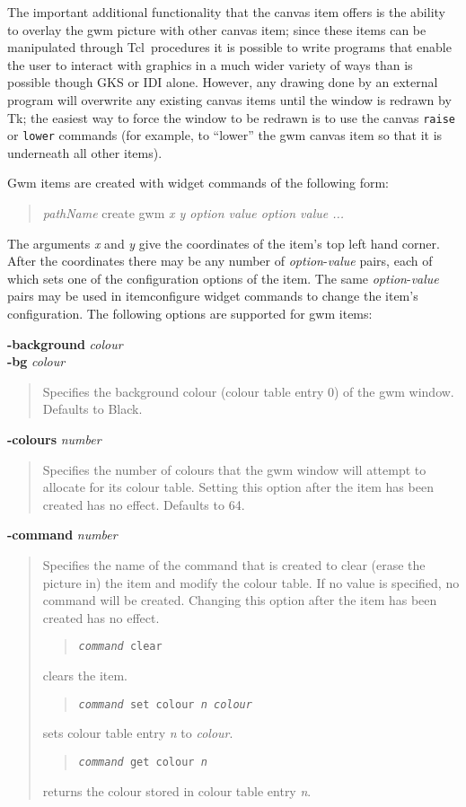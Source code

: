 \documentclass[twoside,11pt,nolof]{starlink}
\newenvironment{rquote}{\begin{quote}\raggedright}{\end{quote}}
\providecommand{\Tcl}{{\textsf{Tcl}}}
\begin{document}
The important additional functionality that the canvas item offers is the
ability to overlay the gwm picture with other canvas item; since these items
can be manipulated through \Tcl\ procedures it is possible to write programs
that enable the user to interact with graphics in a much wider variety of
ways than is possible though GKS or IDI alone. However, any drawing done
by an external program will overwrite any existing canvas items until the
window is redrawn by Tk; the easiest way to force the window to be redrawn
is to use the canvas \texttt{raise} or \texttt{lower} commands (for example, to
``lower'' the gwm canvas item so that it is underneath all  other items).

Gwm items are created with widget commands of the following form:

\begin{quote}
\emph{pathName} create gwm \emph{x y option value option value ...}
\end{quote}

The arguments \emph{x} and \emph{y} give the coordinates of the item's
top left hand corner. After the coordinates there may be any number of
\emph{option}-\emph{value} pairs, each of which sets one of the
configuration options of the item. The same \emph{option}-\emph{value}
pairs may be used in itemconfigure widget commands to change the item's
configuration. The following options are supported for gwm items:

\textbf{-background} \emph{colour}\\
\textbf{-bg} \emph{colour}

\begin{rquote}
Specifies the background colour (colour table entry 0) of the gwm window.
Defaults to Black.
\end{rquote}

\textbf{-colours} \emph{number}
\begin{rquote}
Specifies the number of colours that the gwm window will attempt to allocate
for its colour table. Setting this option after the item has been created
has no effect. Defaults to 64.
\end{rquote}

\textbf{-command} \emph{number}
\begin{rquote}
Specifies the name of the command that is created to clear (erase the picture
in) the item and modify the colour table. If no value is specified, no
command will be created. Changing this option after the item has been created
has no effect.
\begin{quote}
\texttt{\emph{command} clear}
\end{quote}
clears the item.
\begin{quote}
\texttt{\emph{command} set colour \emph{n} \emph{colour}}
\end{quote}
sets colour table entry \emph{n} to \emph{colour}.
\begin{quote}
\texttt{\emph{command} get colour \emph{n}}
\end{quote}
returns the colour stored in colour table entry \emph{n}.
\end{rquote}
\end{document}
